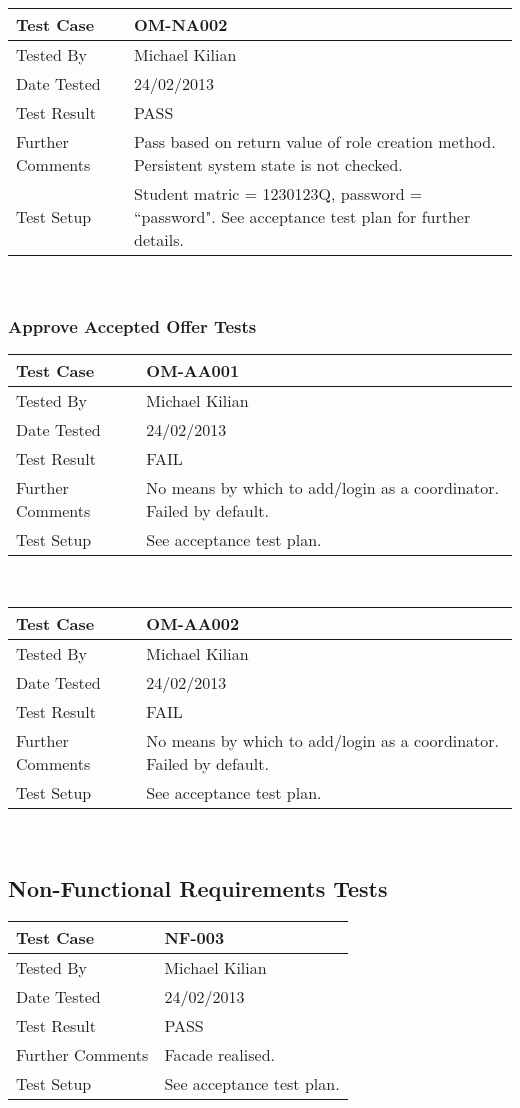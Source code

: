 \documentclass{l3deliverable}
\begin{document}
\begin{tabular}{lp{10cm}}
\hline 
\textbf{Test Case} & OM-NA002\tabularnewline
\hline 
\hline 
Tested By & Michael Kilian\tabularnewline
\hline 
Date Tested & 24/02/2013\tabularnewline
\hline 
Test Result & PASS\tabularnewline
\hline
Further Comments & Pass based on return value of role creation method. Persistent system state is not checked. \tabularnewline
\hline
Test Setup & Student matric = 1230123Q, password = ``password". See acceptance test plan for further details.\tabularnewline
\hline
\end{tabular}\\

\subsubsection{Approve Accepted Offer Tests}
\begin{tabular}{lp{10cm}}
\hline 
\textbf{Test Case} & OM-AA001\tabularnewline
\hline 
\hline 
Tested By & Michael Kilian\tabularnewline
\hline 
Date Tested & 24/02/2013\tabularnewline
\hline 
Test Result & FAIL\tabularnewline
\hline
Further Comments & No means by which to add/login as a coordinator. Failed by default.\tabularnewline
\hline
Test Setup & See acceptance test plan.\tabularnewline
\hline
\end{tabular}\\

\begin{tabular}{lp{10cm}}
\hline 
\textbf{Test Case} & OM-AA002\tabularnewline
\hline 
\hline 
Tested By & Michael Kilian\tabularnewline
\hline 
Date Tested & 24/02/2013\tabularnewline
\hline 
Test Result & FAIL\tabularnewline
\hline
Further Comments & No means by which to add/login as a coordinator. Failed by default.\tabularnewline
\hline
Test Setup & See acceptance test plan.\tabularnewline
\hline
\end{tabular}\\

\newpage 

\subsection{Non-Functional Requirements Tests}
\begin{tabular}{lp{10cm}}
\hline 
\textbf{Test Case} & NF-003\tabularnewline
\hline 
\hline 
Tested By & Michael Kilian\tabularnewline
\hline 
Date Tested & 24/02/2013\tabularnewline
\hline 
Test Result & PASS\tabularnewline
\hline
Further Comments & Facade realised.\tabularnewline
\hline
Test Setup & See acceptance test plan.\tabularnewline
\hline
\end{tabular}\\
\end{document}
